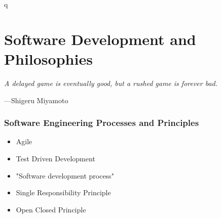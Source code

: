 q%


\part*{Software Development and Philosophies}

\vspace{4mm}
\begin{displayquote}
	\textit{A delayed game is eventually good, but a rushed game is forever bad.}
	\vspace{2mm}
	\begin{flushright}
		---Shigeru Miyamoto
	\end{flushright}
\end{displayquote}
\vspace{4mm}




\toclineskip
\section{Software Engineering Processes and Principles}


\begin{itemize}
	\item Agile
	\item Test Driven Development
	\item "Software development process"
	\item Single Responsibility Principle
	\item Open Closed Principle
\end{itemize}

